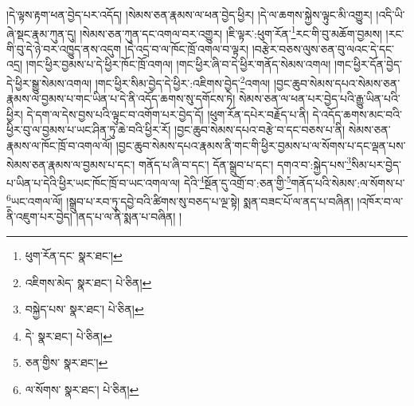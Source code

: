 །དེ་ལྟས་རྟག་ཕན་བྱེད་པར་འདོད། །སེམས་ཅན་རྣམས་ལ་ཕན་བྱེད་ཕྱིར། །དེ་ལ་ཆགས་སྐྱེས་ལྟུང་མི་འགྱུར། །འདི་ཡི་ཞེ་སྡང་རྣམ་ཀུན་དུ། །སེམས་ཅན་ཀུན་དང་འགལ་བར་འགྱུར། །ཇི་ལྟར་:ཕུག་རོན་\footnote{ཕུག་རོན་དང་  སྣར་ཐང་། }རང་གི་བུ་མཆོག་བྱམས། །རང་གི་བུ་དེ་ཉེ་བར་འཁྱུད་ནས་འདུག །དེ་འདྲ་བ་ལ་ཁོང་ཁྲོ་འགལ་བ་ལྟར། །བརྩེར་བཅས་ལུས་ཅན་བུ་ལའང་དེ་དང་འདྲ། །གང་ཕྱིར་བྱམས་པ་དེ་ཕྱིར་ཁོང་ཁྲོ་འགལ། །གང་ཕྱིར་ཞི་བ་དེ་ཕྱིར་གནོད་སེམས་འགལ། །གང་ཕྱིར་དོན་བྱེད་དེ་ཕྱིར་སྒྱུ་སེམས་འགལ། །གང་ཕྱིར་སིམ་བྱེད་དེ་ཕྱིར་:འཇིགས་བྱེད་\footnote{འཇིགས་མེད་  སྣར་ཐང་།  པེ་ཅིན། }འགལ། །བྱང་ཆུབ་སེམས་དཔའ་སེམས་ཅན་རྣམས་ལ་བྱམས་པ་གང་ཡིན་པ་དེ་ནི་འདོད་ཆགས་སུ་དགོངས་ཏེ། སེམས་ཅན་ལ་ཕན་པར་བྱེད་པའི་རྒྱུ་ཡིན་པའི་ཕྱིར། དེ་དག་ལ་དེས་བྱས་པའི་ལྟུང་བ་འགོག་པར་བྱེད་དོ། །ཕུག་རོན་དཔེར་བརྗོད་པ་ནི། དེ་འདོད་ཆགས་མང་བའི་ཕྱིར་བུ་ལ་བྱམས་པ་ཡང་ཤིན་ཏུ་ཆེ་བའི་ཕྱིར་རོ། །བྱང་ཆུབ་སེམས་དཔའ་བརྩེ་བ་དང་བཅས་པ་ནི། སེམས་ཅན་རྣམས་ལ་ཁོང་ཁྲོ་བ་འགལ་ལོ། །བྱང་ཆུབ་སེམས་དཔའ་རྣམས་ནི་གང་གི་ཕྱིར་བྱམས་པ་ལ་སོགས་པ་དང་ལྡན་པས་སེམས་ཅན་རྣམས་ལ་བྱམས་པ་དང་། གནོད་པ་ཞི་བ་དང་། དོན་སྒྲུབ་པ་དང་། དགའ་བ་:སྐྱེད་པས་\footnote{བསྐྱེད་པས་  སྣར་ཐང་།  པེ་ཅིན། }སིམ་པར་བྱེད་པ་ཡིན་པ་དེའི་ཕྱིར་ཡང་ཁོང་ཁྲོ་བ་ཡང་འགལ་ལ། དེའི་\footnote{དེ་  སྣར་ཐང་།  པེ་ཅིན། }སྔོན་དུ་འགྲོ་བ་:ཅན་གྱི་\footnote{ཅན་གྱིས་  སྣར་ཐང་། }གནོད་པའི་སེམས་:ལ་སོགས་པ་\footnote{ལ་སོགས་  སྣར་ཐང་།  པེ་ཅིན། }ཡང་འགལ་ལོ། །སྒྲུབ་པ་རབ་ཏུ་དབྱེ་བའི་ཚིགས་སུ་བཅད་པ་ལྔ་སྟེ། སྨན་བཟང་པོ་ལ་ནད་པ་བཞིན། །འཁོར་བ་ལ་ནི་འཇུག་པར་བྱེད། །ནད་པ་ལ་ནི་སྨན་པ་བཞིན། །

